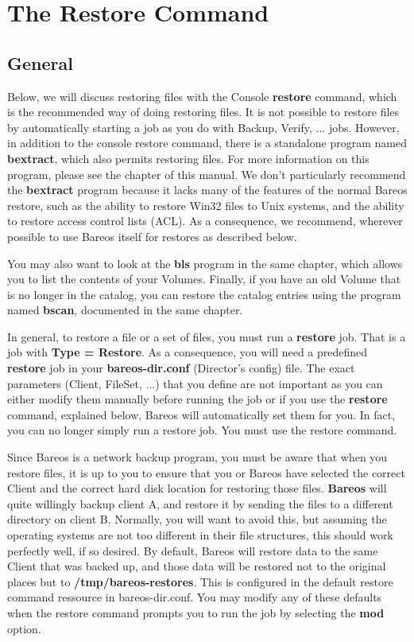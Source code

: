 \chapter{The Restore Command}
\label{RestoreChapter}
\label{_ConsoleChapter}

\section{General}

Below, we will discuss restoring files with the Console {\bf restore} command,
which is the recommended way of doing restoring files. It is not possible
to restore files by automatically starting a job as you do with Backup,
Verify, ... jobs.  However, in addition to the console restore command,
there is a standalone program named {\bf bextract}, which also permits
restoring files.  For more information on this program, please see the
 chapter of this manual. We
don't particularly recommend the {\bf bextract} program because it
lacks many of the features of the normal Bareos restore, such as the
ability to restore Win32 files to Unix systems, and the ability to
restore access control lists (ACL).  As a consequence, we recommend,
wherever possible to use Bareos itself for restores as described below.

You may also want to look at the {\bf bls} program in the same chapter,
which allows you to list the contents of your Volumes.  Finally, if you
have an old Volume that is no longer in the catalog, you can restore the
catalog entries using the program named {\bf bscan}, documented in the same
 chapter.

In general, to restore a file or a set of files, you must run a {\bf restore}
job. That is a job with {\bf Type = Restore}. As a consequence, you will need
a predefined {\bf restore} job in your {\bf bareos-dir.conf} (Director's
config) file. The exact parameters (Client, FileSet, ...) that you define are
not important as you can either modify them manually before running the job or
if you use the {\bf restore} command, explained below, Bareos will
automatically set them for you. In fact, you can no longer simply run a restore
job.  You must use the restore command.

Since Bareos is a network backup program, you must be aware that when you
restore files, it is up to you to ensure that you or Bareos have selected the
correct Client and the correct hard disk location for restoring those files.
{\bf Bareos} will quite willingly backup client A, and restore it by sending
the files to a different directory on client B. Normally, you will want to
avoid this, but assuming the operating systems are not too different in their
file structures, this should work perfectly well, if so desired.
By default, Bareos will restore data to the same Client that was backed
up, and those data will be restored not to the original places but to
{\bf /tmp/bareos-restores}. This is configured in the default restore
command ressource in bareos-dir.conf.  You may modify any of these defaults when the
restore command prompts you to run the job by selecting the {\bf mod}
option.

